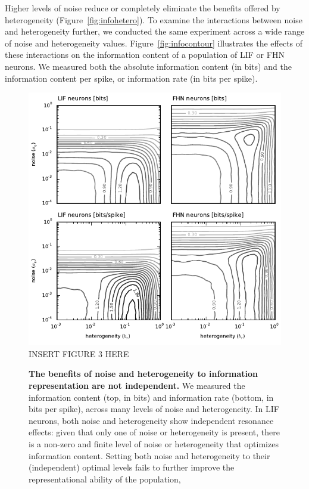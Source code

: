 \documentclass[letterpaper,11pt]{article}
\begin{document}
Higher levels of noise reduce or completely eliminate the benefits offered by heterogeneity (Figure~\ref{fig:infohetero}). To examine the interactions between noise and heterogeneity further, we conducted the same experiment across a wide range of noise and heterogeneity values. Figure~\ref{fig:infocontour} illustrates the effects of these interactions on the information content of a population of LIF or FHN neurons. We measured both the absolute information content (in bits) and the information content per spike, or information rate (in bits per spike).

\begin{figure}
  \ifx\hidefigures\undefined
    \centering
    \includegraphics[width=\textwidth]{figure3_infocontour.pdf}
  \else
    INSERT FIGURE 3 HERE
  \fi
  \caption{
    \textbf{The benefits of noise and heterogeneity to information representation are not independent.}
We measured the information content (top, in bits) and information rate (bottom, in bits per spike),
across many levels of noise and heterogeneity.
In LIF neurons, both noise and heterogeneity show independent resonance effects:
given that only one of noise or heterogeneity is present,
there is a non-zero and finite level of noise or heterogeneity that optimizes information content.
Setting both noise and heterogeneity to their (independent) optimal levels
fails to further improve the representational ability of the population,
}
\end{figure}
\end{document}
